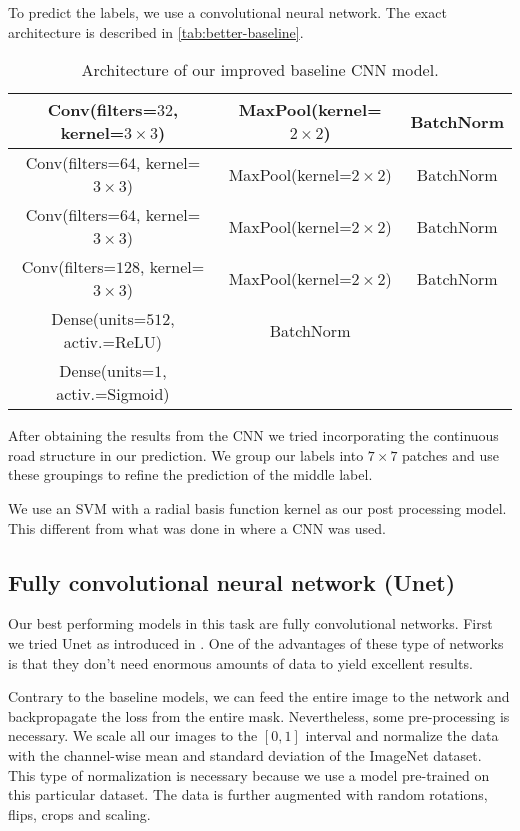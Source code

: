 To predict the labels, we use a convolutional neural network. The exact architecture is described in \autoref{tab:better-baseline}.

\begin{table}[h]
    \centering
    \begin{tabular}{|c|c|c|}
        \hline
        Conv(filters=$32$, kernel=$3 \times 3$) & MaxPool(kernel=$2 \times 2$) & BatchNorm \\
        \hline
        \hline
        Conv(filters=$64$, kernel=$3 \times 3$) & MaxPool(kernel=$2 \times 2$) & BatchNorm \\
        \hline
        \hline
        Conv(filters=$64$, kernel=$3 \times 3$) & MaxPool(kernel=$2 \times 2$) & BatchNorm \\
        \hline
        \hline
        Conv(filters=$128$, kernel=$3 \times 3$) & MaxPool(kernel=$2 \times 2$) &BatchNorm \\
        \hline
        \hline
        Dense(units=$512$, activ.=ReLU) & BatchNorm &  \\
        \hline
        \hline
        Dense(units=$1$, activ.=Sigmoid) & & \\
        \hline
    \end{tabular}
    \caption{Architecture of our improved baseline CNN model.}
    \label{tab:better-baseline}
\end{table}

After obtaining the results from the CNN we tried incorporating the continuous road structure in our prediction. We group our labels into $7 \times 7$ patches and use these groupings to refine the prediction of the middle label.

We use an SVM with a radial basis function kernel as our post processing model. This different from what was done in \cite{He15} where a CNN was used.

\subsection{Fully convolutional neural network (Unet)} \label{subsec:unet}
Our best performing models in this task are fully convolutional networks. First we tried Unet as introduced in \cite{Ron15}. One of the advantages of these type of networks is that they don't need enormous amounts of data to yield excellent results.

Contrary to the baseline models, we can feed the entire image to the network and backpropagate the loss from the entire mask. Nevertheless, some pre-processing is necessary. We scale all our images to the $[0,1]$ interval and normalize the data with the channel-wise mean and standard deviation of the ImageNet \cite{Imagenet} dataset. This type of normalization is necessary because we use a model pre-trained on this particular dataset. The data is further augmented with random rotations, flips, crops and scaling.

